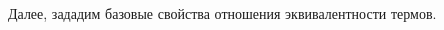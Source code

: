 \documentclass{article}[12pt]
\begin{document}
Далее, зададим базовые свойства отношения эквивалентности термов.
\begin{multicols}{2}
    \begin{prooftree}
    \end{prooftree}
    \begin{prooftree}
    \end{prooftree}
\end{multicols}
\begin{prooftree}
\end{prooftree}
\begin{multicols}{2}
    \begin{prooftree}
    \end{prooftree}
    \begin{prooftree}
    \end{prooftree}
\end{multicols}
\end{document}
